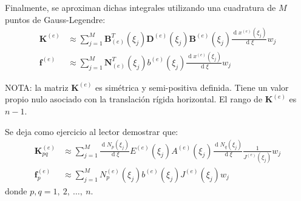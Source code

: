 \documentclass[12pt,letterpaper]{article}
\newcommand{\ma}[1]{{\boldsymbol{#1}}}
\newcommand{\dd}{\operatorname{d} \!}
\begin{document}
Finalmente, se aproximan dichas integrales utilizando una cuadratura de $M$ puntos de Gauss-Legendre:
\begin{align}
\ma{K}^{(e)} &\approx \sum_{j=1}^M \ma{B}_{(e)}^T(\xi_j) \ma{D}^{(e)}(\xi_j) \ma{B}^{(e)}(\xi_j) \frac{\dd x^{(e)}(\xi_j)}{\dd \xi} w_j\\
\ma{f}^{(e)} &\approx \sum_{j=1}^M  \ma{N}_{(e)}^T(\xi_j) b^{(e)}(\xi_j) \frac{\dd x^{(e)}(\xi_j)}{\dd \xi} w_j
\end{align}

NOTA: la matriz $\ma{K}^{(e)}$ es simétrica y semi-positiva definida. Tiene un valor propio nulo asociado con la translación rígida horizontal. El rango de $\ma{K}^{(e)}$ es $n-1$.

Se deja como ejercicio al lector demostrar que:
\begin{align}
\ma{K}^{(e)}_{pq} &\approx \sum_{j=1}^M \frac{\dd N_p(\xi_j)}{\dd \xi} E^{(e)}(\xi_j) A^{(e)}(\xi_j) \frac{\dd N_q(\xi_j)}{\dd \xi} \frac{1}{J^{(e)}(\xi_j)} w_j\\
\ma{f}^{(e)}_p &\approx \sum_{j=1}^M  N_p^{(e)}(\xi_j) b^{(e)}(\xi_j) J^{(e)}(\xi_j) w_j
\end{align}
donde $p, q = 1,\ 2, \ \ldots,\ n$.
\end{document}
